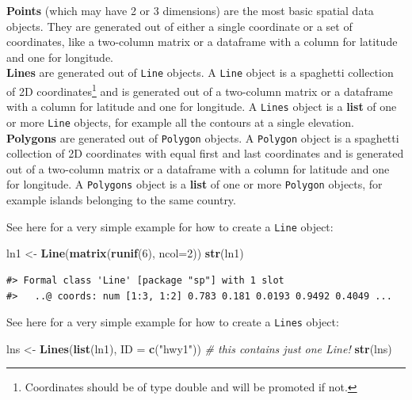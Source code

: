 \documentclass[]{book}
\newenvironment{Shaded}{\begin{snugshade}}{\end{snugshade}}
\newcommand{\KeywordTok}[1]{\textcolor[rgb]{0.13,0.29,0.53}{\textbf{#1}}}
\newcommand{\DataTypeTok}[1]{\textcolor[rgb]{0.13,0.29,0.53}{#1}}
\newcommand{\DecValTok}[1]{\textcolor[rgb]{0.00,0.00,0.81}{#1}}
\newcommand{\StringTok}[1]{\textcolor[rgb]{0.31,0.60,0.02}{#1}}
\newcommand{\CommentTok}[1]{\textcolor[rgb]{0.56,0.35,0.01}{\textit{#1}}}
\newcommand{\NormalTok}[1]{#1}
\let\rmarkdownfootnote\footnote%
\def\footnote{\protect\rmarkdownfootnote}
\theoremstyle{definition}
\theoremstyle{definition}
\theoremstyle{definition}
\theoremstyle{remark}
\begin{document}
\textbf{Points} (which may have 2 or 3 dimensions) are the most basic
spatial data objects. They are generated out of either a single
coordinate or a set of coordinates, like a two-column matrix or a
dataframe with a column for latitude and one for longitude.\\
\textbf{Lines} are generated out of \texttt{Line} objects. A
\texttt{Line} object is a spaghetti collection of 2D
coordinates\footnote{Coordinates should be of type double and will be
  promoted if not.} and is generated out of a two-column matrix or a
dataframe with a column for latitude and one for longitude. A
\texttt{Lines} object is a \textbf{list} of one or more \texttt{Line}
objects, for example all the contours at a single elevation.\\
\textbf{Polygons} are generated out of \texttt{Polygon} objects. A
\texttt{Polygon} object is a spaghetti collection of 2D coordinates with
equal first and last coordinates and is generated out of a two-column
matrix or a dataframe with a column for latitude and one for longitude.
A \texttt{Polygons} object is a \textbf{list} of one or more
\texttt{Polygon} objects, for example islands belonging to the same
country.

See here for a very simple example for how to create a \texttt{Line}
object:

\begin{Shaded}
\begin{Highlighting}[]
\NormalTok{ln1 <-}\StringTok{ }\KeywordTok{Line}\NormalTok{(}\KeywordTok{matrix}\NormalTok{(}\KeywordTok{runif}\NormalTok{(}\DecValTok{6}\NormalTok{), }\DataTypeTok{ncol=}\DecValTok{2}\NormalTok{))}
\KeywordTok{str}\NormalTok{(ln1)}
\end{Highlighting}
\end{Shaded}

\begin{verbatim}
#> Formal class 'Line' [package "sp"] with 1 slot
#>   ..@ coords: num [1:3, 1:2] 0.783 0.181 0.0193 0.9492 0.4049 ...
\end{verbatim}

See here for a very simple example for how to create a \texttt{Lines}
object:

\begin{Shaded}
\begin{Highlighting}[]
\NormalTok{lns <-}\StringTok{ }\KeywordTok{Lines}\NormalTok{(}\KeywordTok{list}\NormalTok{(ln1), }\DataTypeTok{ID =} \KeywordTok{c}\NormalTok{(}\StringTok{"hwy1"}\NormalTok{)) }\CommentTok{# this contains just one Line!}
\KeywordTok{str}\NormalTok{(lns)}
\end{Highlighting}
\end{Shaded}
\end{document}
